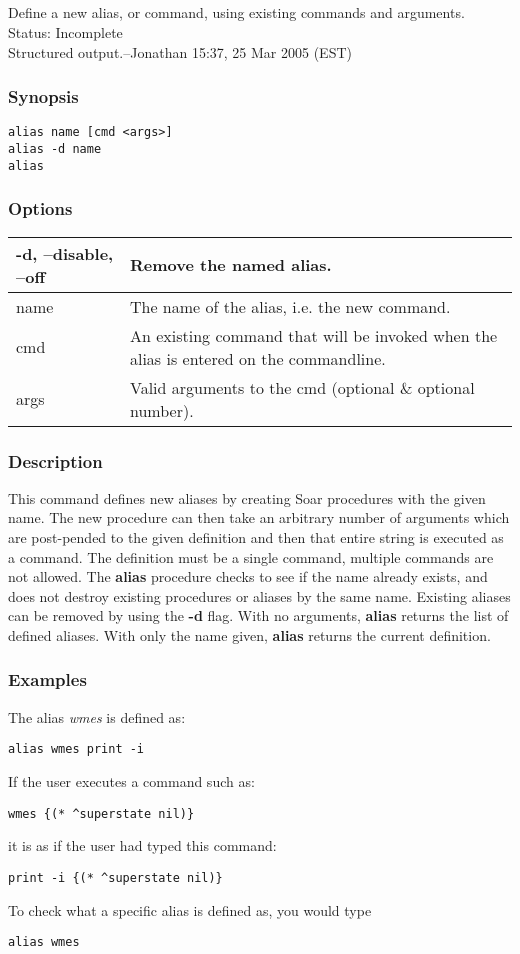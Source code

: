 \subsection{}
\label{alias}
Define a new alias, or command, using existing commands and arguments.\\ 
 Status: Incomplete\\ 
Structured output.--Jonathan 15:37, 25 Mar 2005 (EST) 
\subsubsection*{Synopsis}
  \begin{verbatim}
alias name [cmd <args>]
alias -d name
alias
\end{verbatim}
\subsubsection*{Options}
\begin{tabular}{|l|l|}
\hline 
 -d, --disable, --off  & Remove the named alias.  \\
 \hline 
 name  & The name of the alias, i.e. the new command.  \\
 \hline 
 cmd  & An existing command that will be invoked when the alias is entered on the commandline.  \\
 \hline 
 args  & Valid arguments to the cmd (optional \& optional number).  \\
 \hline 
\end{tabular}
\subsubsection*{Description}
 This command defines new aliases by creating Soar procedures with the given name. The new procedure can then take an arbitrary number of arguments which are post-pended to the given definition and then that entire string is executed as a command. The definition must be a single command, multiple commands are not allowed. The \textbf{alias}
 procedure checks to see if the name already exists, and does not destroy existing procedures or aliases by the same name. Existing aliases can be removed by using the \textbf{-d}
 flag. With no arguments, \textbf{alias}
 returns the list of defined aliases. With only the name given, \textbf{alias}
 returns the current definition. 
\subsubsection*{Examples}
 The alias \emph{wmes}
 is defined as: \begin{verbatim}
alias wmes print -i
\end{verbatim}
 If the user executes a command such as: \begin{verbatim}
wmes {(* ^superstate nil)}
\end{verbatim}
 it is as if the user had typed this command: \begin{verbatim}
print -i {(* ^superstate nil)}
\end{verbatim}
 To check what a specific alias is defined as, you would type \begin{verbatim}
alias wmes
\end{verbatim}
